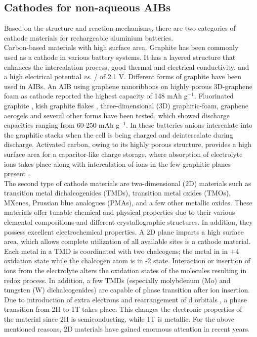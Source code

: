 \subsection{Cathodes for non-aqueous AIBs}
Based on the structure and reaction mechanisms, there are two categories of cathode materials for rechargeable aluminium batteries.\\
Carbon-based materials with high surface area. Graphite has been commonly used as a cathode in various battery systems. It has a layered structure that enhances the intercalation process, good thermal and electrical conductivity, and a high electrical potential \textit{vs.} / of 2.1 V. Different forms of graphite have been used in AIBs. An AIB using graphene nanoribbons on highly porous 3D-graphene foam as cathode reported the highest capacity of 148 mAh g$^{-1}$. Fluorinated graphite \cite{rani_fluorinated_2013}, kish graphite flakes \cite{wang_kish_2017-1}, three-dimensional (3D) graphitic-foam\cite{wu_3d_2016}, graphene aerogels\cite{huang_graphene_2019} and several other forms have been tested, which showed discharge capacities ranging from 60-250 mAh g$^{-1}$. In these batteries  anions intercalate into the graphitic stacks when the cell is being charged and deintercalate during discharge. Activated carbon, owing to its highly porous structure, provides a high surface area for a capacitor-like charge storage, where absorption of electrolyte ions takes place along with intercalation of ions in the few graphitic planes present \cite{eliad_ion_2001, zhu_carbon-based_2011-2}.\\
The second type of cathode materials are two-dimensional (2D) materials such as transition metal dichalcogenides (TMDs), transition metal oxides (TMOs), MXenes, Prussian blue analogues (PMAs), and a few other metallic oxides. These materials offer tunable chemical and physical properties due to their various elemental compositions and different crystallographic structures. In addition, they possess excellent electrochemical properties\cite{chia_electrochemistry_2015}. A 2D plane imparts a high surface area, which allows complete utilization of all available sites is a cathode material\cite{jia_interfacial_2016,naguib_mxene_2012}. Each metal in a TMD is coordinated with two chalcogens; the metal in in +4 oxidation state while the chalcogen atom is in -2 state. Interaction or insertion of ions from the electrolyte alters the oxidation states of the molecules resulting in redox process. In addition, a few TMDs (especially molybdenum (Mo) and tungsten (W) dichalcogenides) are capable of phase transition after ion insertion. Due to introduction of extra electrons and rearrangement of d orbitals \cite{}, a phase transition from 2H to 1T takes place. This changes the electronic properties of the material since 2H  is semiconducting, while 1T  is metallic. For the above mentioned reasons, 2D materials have gained enormous attention in recent years. 

